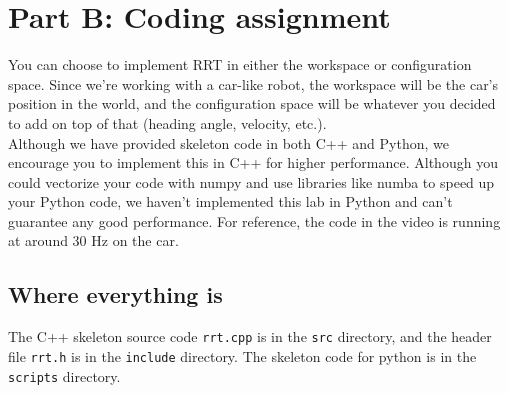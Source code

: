 \documentclass[letter]{article}
\begin{document}
\newpage
\section{Part B: Coding assignment}
You can choose to implement RRT in either the workspace or configuration space. Since we're working with a car-like robot, the workspace will be the car's position in the world, and the configuration space will be whatever you decided to add on top of that (heading angle, velocity, etc.).\\
Although we have provided skeleton code in both C++ and Python, we encourage you to implement this in C++ for higher performance. Although you could vectorize your code with numpy and use libraries like numba to speed up your Python code, we haven't implemented this lab in Python and can't guarantee any good performance. For reference, the code in the video is running at around 30 Hz on the car.

\subsection{Where everything is}
The C++ skeleton source code \texttt{rrt.cpp} is in the \texttt{src} directory, and the header file \texttt{rrt.h} is in the \texttt{include} directory. The skeleton code for python is in the \texttt{scripts} directory.
\end{document}
